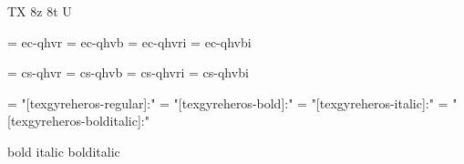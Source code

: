 

\ifx\ffdecl\undefined  \fi

\ffdecl [TG Heros] {\caps \cond} {\rm \bf \it \bi} {} {TX} {8z 8t U}

\def\caps{\ffsetV{caps}{-sc}\ffsetX}  \def\nocaps{\ffsetV{caps}{}\ffsetX}
\def\cond{\ffsetV{cond}{c}\ffsetX}    \def\nocond{\ffsetV{cond}{}\ffsetX}
\def\capsV{} 
\def\condV{} 

\ismacro{}\ifttrue

   \font\tenrm = ec-qhvr  \sizespec
   \font\tenbf = ec-qhvb  \sizespec
   \font\tenit = ec-qhvri \sizespec
   \font\tenbi = ec-qhvbi \sizespec

   \def\ffnamegen{ec-qhv\condV\ffvarV\capsV}

\fi

\ismacro{}\iftrue

   \font\tenrm = cs-qhvr  \sizespec
   \font\tenbf = cs-qhvb  \sizespec
   \font\tenit = cs-qhvri \sizespec
   \font\tenbi = cs-qhvbi \sizespec

   \def\ffnamegen{cs-qhv\condV\ffvarV\capsV}
   

\fi

\ismacro{}\iftrue

   \font\tenrm = "[texgyreheros-regular]:\fontfeatures"    \sizespec
   \font\tenbf = "[texgyreheros-bold]:\fontfeatures"       \sizespec
   \font\tenit = "[texgyreheros-italic]:\fontfeatures"     \sizespec
   \font\tenbi = "[texgyreheros-bolditalic]:\fontfeatures" \sizespec

   \def\ffnamegen{"[texgyreheros\condV-\ffvarV]:\capsV\fontfeatures"} 

    {bold} {italic} {bolditalic}
   \def\caps{\ffsetV{caps}{+smcp;}\ffsetX}
   \def\cond{\ffsetV{cond}{cn}\ffsetX}

\fi
\tenrm %

\def\narrow{\cond\fam}

\ifx\loadmathfonts\relax \endinput \fi
\ifx\mathpreloaded X\else  \fi                     

\endinput

--------------------------------------------------------------

